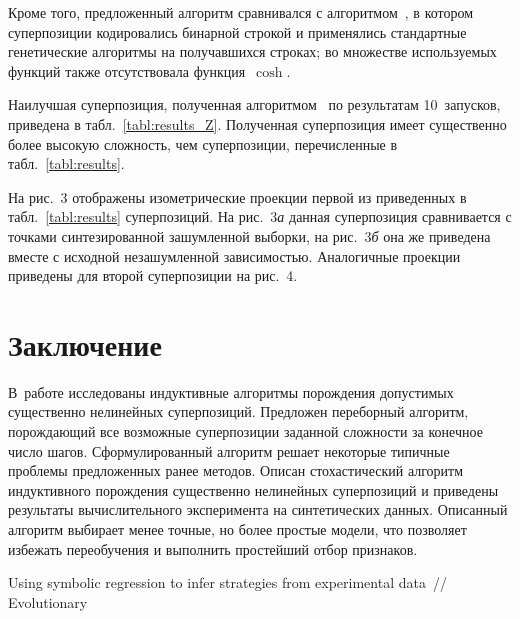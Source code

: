 \begin{multicols}{2}
Кроме того, предложенный алгоритм сравнивался с алгоритмом~\cite{Zelinka2008},
в котором суперпозиции кодировались бинарной строкой и применялись стандартные
генетические алгоритмы на получавшихся строках; во множестве используемых
функций также отсутствовала функция~$\cosh$.



Наилучшая суперпозиция, полученная алгоритмом~\cite{Zelinka2008} по результатам
10~запусков, приведена в табл.~\ref{tabl:results_Z}. Полученная суперпозиция
имеет существенно более высокую сложность, чем суперпозиции, перечисленные в
табл.~\ref{tabl:results}.

На рис.~3 отображены изометрические
проекции первой из приведенных в табл.~\ref{tabl:results} суперпозиций. На
рис.~3\textit{а} данная суперпозиция сравнивается с точками синтезированной
зашумленной выборки, на рис.~3\textit{б}  она же приведена вместе
с исходной незашумленной зависимостью. Аналогичные проекции
приведены для второй суперпозиции на рис.~4.

\vspace*{-6pt}

\section{Заключение}

В~работе исследованы индуктивные алгоритмы порождения допустимых существенно
нелинейных суперпозиций. Предложен переборный алгоритм, порождающий все
возможные суперпозиции заданной сложности за конечное число шагов.
Сформулированный алгоритм решает некоторые типичные проблемы предложенных ранее методов.
Описан стохастический алгоритм индуктивного порождения существенно нелинейных
суперпозиций и приведены результаты вычислительного эксперимента на синтетических
данных. Описанный алгоритм выбирает менее точные, но более простые
модели, что позволяет избежать переобучения и выполнить простейший отбор признаков.

\vspace*{-6pt}

{\small\frenchspacing
{%
\begin{thebibliography}{99}

 Using symbolic regression to infer strategies 
from experimental data~// Evolutionary\linebreak\vspace*{-12pt}\columnbreak


\end{thebibliography}}}
\end{multicols}
